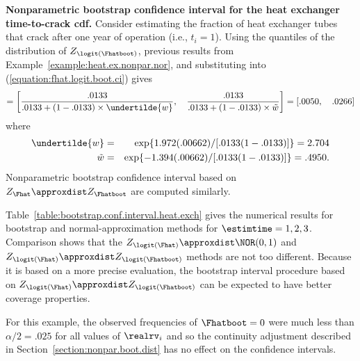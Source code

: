 \begin{example}
{\bf Nonparametric bootstrap confidence interval for the heat
exchanger time-to-crack cdf.}  Consider estimating the fraction of
heat exchanger tubes that crack after one year of operation (i.e.,
$t_{i}=1$). Using the quantiles of the distribution of
$Z_{\logit(\Fhatboot)}$, previous results from
Example~\ref{example:heat.ex.nonpar.nor}, and substituting into
(\ref{equation:fhat.logit.boot.ci}) gives
\begin{displaymath}
[\undertilde{F}(t_{i}), \quad \tilde{F}(t_{i})] = 
\left[\frac{.0133}{.0133
+(1-.0133) \times \undertilde{w}},  \quad \frac{.0133}{.0133+
(1-.0133) \times \tilde{w}}\right] = [.0050, \quad .0266]
\end{displaymath}
where
\begin{eqnarray*}
\undertilde{w}  &=&  \exp\{1.972(.00662)/[.0133 (1-.0133)]\}= 2.704\\
\tilde{w}  &=&  \exp\{-1.394(.00662)/[.0133 (1-.0133)]\}= .4950.
\end{eqnarray*}
Nonparametric bootstrap confidence interval based on
$Z_{\Fhat} \approxdist Z_{\Fhatboot}$ are computed
similarly.

Table~\ref{table:bootstrap.conf.interval.heat.exch} gives the numerical results
for bootstrap and normal-approximation methods for $\estimtime=1,2,3$.
Comparison shows that the $Z_{\logit(\Fhat)} \approxdist
\NOR(0,1)$ and $Z_{\logit(\Fhat)} \approxdist
Z_{\logit(\Fhatboot)} $ methods are not too different.  Because
it is based on a more precise evaluation, the bootstrap interval
procedure based on $Z_{\logit(\Fhat)} \approxdist
Z_{\logit(\Fhatboot)}$ can be expected to have better coverage
properties.   

For this example, the observed frequencies of $\Fhatboot=0$
were much less than $\alpha/2=.025$ for all values of $\realrv_{i}$ and so
the continuity adjustment described in
Section~\ref{section:nonpar.boot.dist} has no effect
on the confidence intervals.
\end{example}

